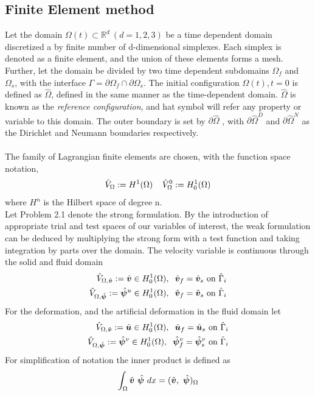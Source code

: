 \subsection{Finite Element method}
Let the domain $\Omega(t) \subset \mathbb{R}^d \ (d = 1, 2, 3) $ be a time dependent domain discretized a by finite number of d-dimensional simplexes. Each simplex is denoted as a finite element, and the union of these elements forms a mesh. Further, let the domain be divided by two time dependent subdomains $\Omega_f$ and $\Omega_s$, with the interface $\Gamma = \partial \Omega_f \cap \partial \Omega_s$. The initial configuration $\Omega(t), t = 0 $ is defined as $\hat{\Omega}$, defined in the same manner as the time-dependent domain. $\hat{\Omega}$ is known as the \textit{reference configuration}, and hat symbol will refer any property or variable to this domain. The outer boundary is set by $\partial \hat{\Omega}$ , with $\partial \hat{\Omega}^D$ and $\partial \hat{\Omega}^N$ as the Dirichlet and Neumann boundaries respectively. \\ \\
The family of Lagrangian finite elements are chosen, with the function space notation,
\begin{align*}
\hat{V}_{\Omega} := H^1(\Omega) \hspace{4mm} 
\hat{V}_{\Omega}^0 := H_0^1(\Omega)  
\end{align*}
where $H^n$ is the Hilbert space of degree n. \\
Let Problem 2.1 denote the strong formulation. By the introduction of appropriate trial and test spaces of our variables of interest, the weak formulation can be deduced by multiplying the strong form with a test function and taking integration by parts over the domain. The velocity variable is continuous through the solid and fluid domain
\begin{align*}
\hat{V}_{\Omega, \hat{\bm{v}}} := \hat{\bm{v}} \in H_0^1(\Omega), \hspace{2mm} 
\hat{\bm{v}}_f = \hat{\bm{v}}_s \ \text{on} \ \hat{\Gamma}_i \\
\hat{V}_{\Omega, \hat{\bm{\psi}}} := \hat{\bm{\psi}}^u \in H_0^1(\Omega), \hspace{2mm} 
\hat{\bm{v}}_f = \hat{\bm{v}}_s \ \text{on} \ \hat{\Gamma}_i 
\end{align*}
For the deformation, and the artificial deformation in the fluid domain let
\begin{align*}
\hat{V}_{\Omega, \hat{\bm{v}}} := \hat{\bm{u}} \in H_0^1(\Omega), \hspace{2mm} 
\hat{\bm{u}}_f = \hat{\bm{u}}_s \ \text{on} \ \hat{\Gamma}_i \\
\hat{V}_{\Omega, \hat{\bm{\psi}}} := \hat{\bm{\psi}}^v \in H_0^1(\Omega), \hspace{2mm} 
\hat{\bm{\psi}}_f^v = \hat{\bm{\psi}}_s^v \ \text{on} \ \hat{\Gamma}_i 
\end{align*}
For simplification of notation the inner product is defined as
\begin{align*}
\int_{\Omega} \gat{v} \ \gat{\psi} \ dx = (\gat{v}, \ \gat{\psi})_{\Omega}
\end{align*}
 
